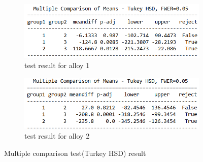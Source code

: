 \documentclass[12pt,a4paper]{style}
\begin{document}
	\begin{figure}
		\centering
		\begin{subfigure}[t]{0.45\textwidth}
			\includegraphics[width=\textwidth]{HSD_alloy1}
			\caption{test result for alloy 1}
			\label{fig:hsd-alloy1}
		\end{subfigure}
		\hfill
	\begin{subfigure}[t]{0.45\textwidth}
			\includegraphics[width=\textwidth]{HSD_alloy2.png}
			\caption{test result for alloy 2}
			\label{fig:hsd-alloy2}
		\end{subfigure}
		\caption{Multiple comparison test(Turkey HSD) result}
		\label{fig:hsd}
	\end{figure}
\end{document}
